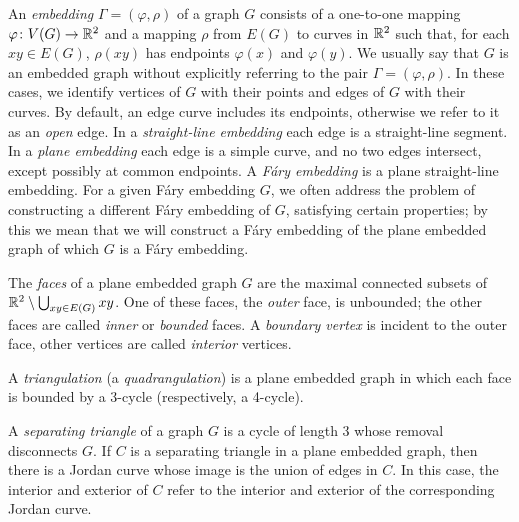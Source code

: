 An \emph{embedding} $\Gamma=(\varphi,\rho)$ of a graph $G$ consists
of a one-to-one mapping $\varphi\colon V(G)\to\mathbb{R}^2$ and a mapping $\rho$ from
$E(G)$ to curves in $\mathbb{R}^2$ such that, for each $xy\in E(G)$, $\rho(xy)$
has endpoints $\varphi(x)$ and $\varphi(y)$.
We usually say that $G$ is an embedded graph
without explicitly referring to the pair $\Gamma=(\varphi,\rho)$.
In these cases, we identify vertices of $G$ with their
points and edges of $G$ with their curves. By default, an edge curve includes
its endpoints, otherwise we refer to it as an \emph{open} edge.
%
In a \emph{straight-line embedding} each edge is a straight-line segment. In a \emph{plane embedding} each edge is a simple curve, and no two edges intersect, except possibly at common endpoints. A \emph{F\'ary embedding} is a plane straight-line embedding. For a given F\'ary embedding $G$, we often address the problem of constructing a different F\'ary embedding of $G$, satisfying certain properties; by this we mean that we will construct a F\'ary embedding of the plane embedded graph of which $G$ is a F\'ary embedding.

The \emph{faces} of a plane embedded graph $G$ are the maximal connected
subsets of $\mathbb{R}^2\setminus\bigcup_{xy\in E(G)} xy$.  One of
these faces, the \emph{outer} face, is unbounded; the other faces are called \emph{inner} or \emph{bounded} faces. A {\em boundary vertex} is incident to the outer face, other vertices are called \emph{interior} vertices.

A \emph{triangulation} (a \emph{quadrangulation}) is a plane embedded
graph in which each face is bounded by a 3-cycle (respectively, a 4-cycle). 

A \emph{separating triangle} of a graph $G$ is
a cycle of length 3
 whose removal disconnects $G$.
 If
 $C$ is a separating triangle in a plane embedded graph, then
 there is a 
Jordan curve whose image
is the union of edges in $C$.  In this case, the interior and exterior of
$C$ refer to the interior and exterior of the corresponding Jordan curve.

